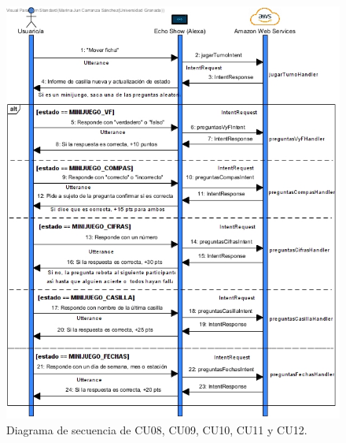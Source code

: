 \begin{figure}[H]
	\centering
	\includegraphics[width=1\textwidth]{imgs/DS04.jpg}
	\caption{Diagrama de secuencia de CU08, CU09, CU10, CU11 y CU12.}
	\label{fig:DS04}
\end{figure}


